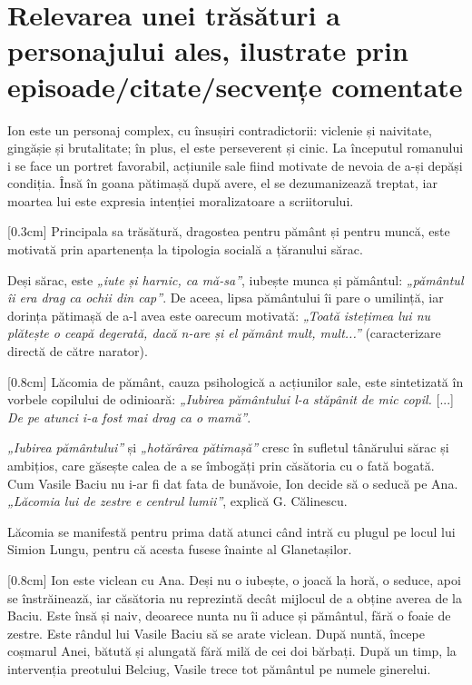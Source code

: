 \section{Relevarea unei trăsături a personajului ales, ilustrate prin episoade/citate/secvențe comentate}

Ion este un personaj complex, cu însușiri contradictorii: viclenie și naivitate, gingășie și brutalitate; în plus, el este perseverent și cinic. La începutul romanului i se face un portret favorabil, acțiunile sale fiind motivate de nevoia de a-și depăși condiția. Însă în goana pătimașă după avere, el se dezumanizează treptat, iar moartea lui este expresia intenției moralizatoare a scriitorului.

[0.3cm]
Principala sa trăsătură, dragostea pentru pământ și pentru muncă, este motivată prin apartenența la tipologia socială a țăranului sărac.

Deși sărac, este \textit{„iute și harnic, ca mă-sa”}, iubește munca și pământul: \textit{„pământul îi era drag ca ochii din cap”}. De aceea, lipsa pământului îi pare o umilință, iar dorința pătimașă de a-l avea este oarecum motivată: \textit{„Toată istețimea lui nu plătește o ceapă degerată, dacă n-are și el pământ mult, mult...”} (caracterizare directă de către narator).

[0.8cm]
Lăcomia de pământ, cauza psihologică a acțiunilor sale, este sintetizată în vorbele copilului de odinioară: \textit{„Iubirea pământului l-a stăpânit de mic copil.} [...] \textit{De pe atunci i-a fost mai drag ca o mamă”}.

\textit{„Iubirea pământului”} și \textit{„hotărârea pătimașă”} cresc în sufletul tânărului sărac și ambițios, care găsește calea de a se îmbogăți prin căsătoria cu o fată bogată. Cum Vasile Baciu nu i-ar fi dat fata de bunăvoie, Ion decide să o seducă pe Ana. \textit{„Lăcomia lui de zestre e centrul lumii”}, explică G. Călinescu.

Lăcomia se manifestă pentru prima dată atunci când intră cu plugul pe locul lui Simion Lungu, pentru că acesta fusese înainte al Glanetașilor.

[0.8cm]
Ion este viclean cu Ana. Deși nu o iubește, o joacă la horă, o seduce, apoi se înstrăinează, iar căsătoria nu reprezintă decât mijlocul de a obține averea de la Baciu. Este însă și naiv, deoarece nunta nu îi aduce și pământul, fără o foaie de zestre. Este rândul lui Vasile Baciu să se arate viclean. După nuntă, începe coșmarul Anei, bătută și alungată fără milă de cei doi bărbați. După un timp, la intervenția preotului Belciug, Vasile trece tot pământul pe numele ginerelui.

